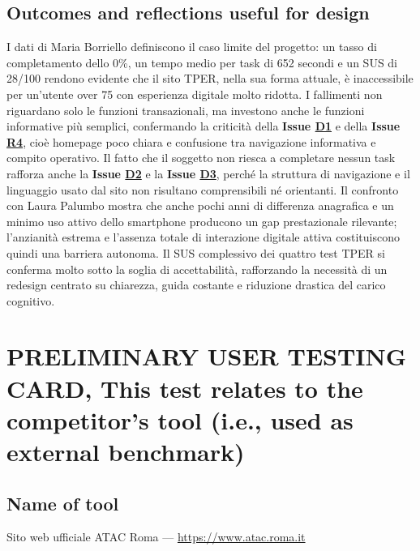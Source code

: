 \documentclass[11pt,a4paper]{article}
\begin{document}
\subsection*{Outcomes and reflections useful for design}
\begin{tcolorbox}[colback=backgroundColor,colframe=borderColor,arc=2mm]
I dati di Maria Borriello definiscono il caso limite del progetto: un tasso di completamento dello 0\%, un tempo medio per task di 652 secondi e un SUS di 28/100 rendono evidente che il sito TPER, nella sua forma attuale, è inaccessibile per un'utente over 75 con esperienza digitale molto ridotta. I fallimenti non riguardano solo le funzioni transazionali, ma investono anche le funzioni informative più semplici, confermando la criticità della \textbf{Issue \hyperref[iss:D1]{D1}} e della \textbf{Issue \hyperref[iss:R4]{R4}}, cioè homepage poco chiara e confusione tra navigazione informativa e compito operativo. Il fatto che il soggetto non riesca a completare nessun task rafforza anche la \textbf{Issue \hyperref[iss:D2]{D2}} e la \textbf{Issue \hyperref[iss:D3]{D3}}, perché la struttura di navigazione e il linguaggio usato dal sito non risultano comprensibili né orientanti. Il confronto con Laura Palumbo mostra che anche pochi anni di differenza anagrafica e un minimo uso attivo dello smartphone producono un gap prestazionale rilevante; l'anzianità estrema e l'assenza totale di interazione digitale attiva costituiscono quindi una barriera autonoma. Il SUS complessivo dei quattro test TPER si conferma molto sotto la soglia di accettabilità, rafforzando la necessità di un redesign centrato su chiarezza, guida costante e riduzione drastica del carico cognitivo.
\end{tcolorbox}
\newpage

\newpage

\section{PRELIMINARY USER TESTING CARD, This test relates to the competitor's tool (i.e., used as external benchmark)}
\vspace{0.2cm}

\subsection*{Name of tool}
\begin{tcolorbox}[colback=backgroundColor,colframe=borderColor,arc=2mm]
Sito web ufficiale ATAC Roma --- \url{https://www.atac.roma.it}
\end{tcolorbox}
\end{document}
